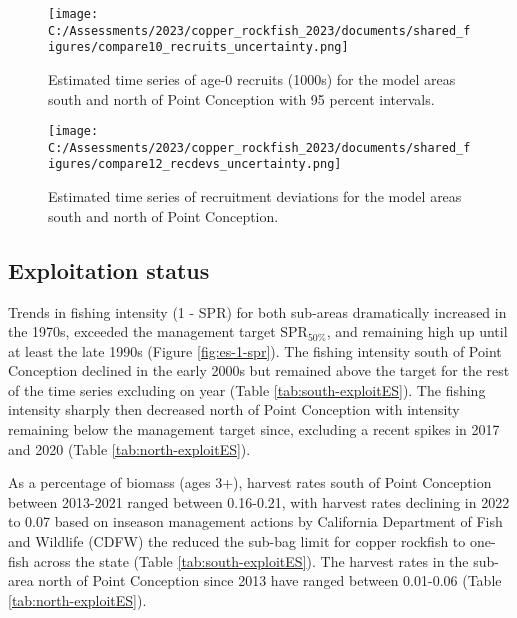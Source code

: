 \documentclass[11pt,
  english,
  letterpaper,
]{article}
\begin{document}




\begin{figure}
\centering
\texttt{[image: C:/Assessments/2023/copper\_rockfish\_2023/documents/shared\_figures/compare10\_recruits\_uncertainty.png]}
\caption{Estimated time series of age-0 recruits (1000s) for the model areas south and north of Point Conception with 95 percent intervals.\label{fig:es-recruits}}
\end{figure}

\begin{figure}
\centering
\texttt{[image: C:/Assessments/2023/copper\_rockfish\_2023/documents/shared\_figures/compare12\_recdevs\_uncertainty.png]}
\caption{Estimated time series of recruitment deviations for the model areas south and north of Point Conception.\label{fig:es-rec-devs}}
\end{figure}

\clearpage

\hypertarget{exploitation-status}{%
\subsection*{Exploitation status}\label{exploitation-status}}

Trends in fishing intensity (1 - SPR) for both sub-areas dramatically increased in the 1970s, exceeded the management target \(\text{SPR}_{50\%}\), and remaining high up until at least the late 1990s (Figure \ref{fig:es-1-spr}). The fishing intensity south of Point Conception declined in the early 2000s but remained above the target for the rest of the time series excluding on year (Table \ref{tab:south-exploitES}). The fishing intensity sharply then decreased north of Point Conception with intensity remaining below the management target since, excluding a recent spikes in 2017 and 2020 (Table \ref{tab:north-exploitES}).

As a percentage of biomass (ages 3+), harvest rates south of Point Conception between 2013-2021 ranged between 0.16-0.21, with harvest rates declining in 2022 to 0.07 based on inseason management actions by California Department of Fish and Wildlife (CDFW) the reduced the sub-bag limit for copper rockfish to one-fish across the state (Table \ref{tab:south-exploitES}). The harvest rates in the sub-area north of Point Conception since 2013 have ranged between 0.01-0.06 (Table \ref{tab:north-exploitES}).
\end{document}
